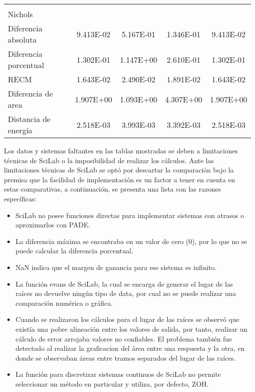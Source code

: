{\begin{longtable}{l @{\extracolsep{\fill}} cccc}
            & & & & \\
            Nichols                & & & & \\ \cmidrule{1-1}
            Diferencia absoluta    & \num{9.413E-02} & \num{5.167E-01} & \num{1.346E-01} & \num{9.413E-02}  \\
            Diferencia porcentual  & \num{1.302E-01} & \num{1.147E+00} & \num{2.610E-01} & \num{1.302E-01}  \\
            RECM                   & \num{1.643E-02} & \num{2.490E-02} & \num{1.891E-02} & \num{1.643E-02}  \\
            Diferencia de area     & \num{1.907E+00} & \num{1.093E+00} & \num{4.307E+00} & \num{1.907E+00}  \\
            Distancia de energía   & \num{2.518E-03} & \num{3.993E-03} & \num{3.392E-03} & \num{2.518E-03}  \\
        \end{longtable}}

        Los datos y sistemas faltantes en las tablas mostradas se deben a limitaciones técnicas de SciLab o la imposibilidad de realizar los cálculos. Ante las limitaciones técnicas de SciLab se optó por descartar la comparación bajo la premisa que la facilidad de implementación es un factor a tener en cuenta en estas comparativas, a continuación, se presenta una lista con las razones específicas:

        \begin{itemize}[leftmargin=\parindent]
            \item SciLab no posee funciones directas para implementar sistemas con atrasos o aproximarlos con PADE.
            \item La diferencia máxima se encontraba en un valor de cero (0), por lo que no se puede calcular la diferencia porcentual.
            \item NaN indica que el margen de ganancia para ese sistema es infinito.
            \item La función evans de SciLab, la cual se encarga de generar el lugar de las raíces no devuelve ningún tipo de data, por cual no se puede realizar una comparación numérica o gráfica.
            \item Cuando se realizaron los cálculos para el lugar de las raíces se observó que existía una pobre alineación entre los valores de salida, por tanto, realizar un cálculo de error arrojaba valores no confiables. El problema también fue detectado al realizar la graficacion del área entre una respuesta y la otra, en donde se observaban áreas entre tramos separados del lugar de las raíces.
            \item La función para discretizar sistemas continuos de SciLab no permite seleccionar un método en particular y utiliza, por defecto, ZOH.
        \end{itemize}

